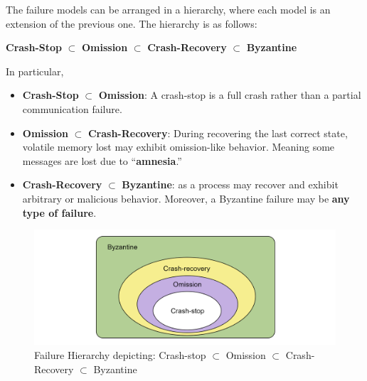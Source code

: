 \begin{theo}

    The failure models can be arranged in a hierarchy, where each model is an extension of the previous one. 
    The hierarchy is as follows:
    \begin{center}
        \textbf{Crash-Stop} $\subset$ \textbf{Omission} $\subset$ \textbf{Crash-Recovery} $\subset$ \textbf{Byzantine}
    \end{center}
    In particular, 
    \begin{itemize}
        \item \textbf{Crash-Stop} $\subset$ \textbf{Omission}: A crash-stop is a full crash rather than a partial communication failure.
        \item \textbf{Omission} $\subset$ \textbf{Crash-Recovery}: During recovering the last correct state, volatile memory lost may exhibit omission-like behavior. Meaning some messages are lost due to ``\textbf{amnesia}.''
        \item \textbf{Crash-Recovery} $\subset$ \textbf{Byzantine}: as a process may recover and exhibit arbitrary or malicious behavior. Moreover, a Byzantine failure may be \textbf{any type of failure}.
    \end{itemize}
\end{theo}

\begin{figure}[h]
    \centering
    \includegraphics[width=\textwidth]{Sections/crash/fail.png}
    \caption{Failure Hierarchy depicting: Crash-stop $\subset$ Omission $\subset$ Crash-Recovery $\subset$ Byzantine}
\end{figure}




